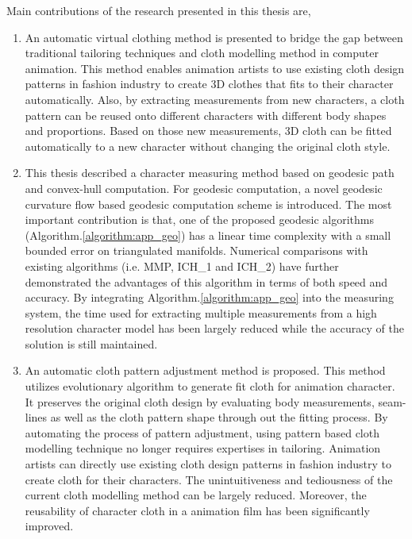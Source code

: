 Main contributions of the research presented in this thesis are,
\begin{enumerate}

	\item An automatic virtual clothing method is presented to bridge the gap between traditional tailoring techniques and cloth modelling method in computer animation. This method enables animation artists to use existing cloth design patterns in fashion industry to create 3D clothes that fits to their character automatically. Also, by extracting measurements from new characters, a cloth pattern can be reused onto different characters with different body shapes and proportions. Based on those new measurements, 3D cloth can be fitted automatically to a new character without changing the original cloth style. 

	\item This thesis described a character measuring method based on geodesic path and convex-hull computation. For geodesic computation, a novel geodesic curvature flow based geodesic computation scheme is introduced. The most important contribution is that, one of the proposed geodesic algorithms (Algorithm.\ref{algorithm:app_geo}) has a linear time complexity with a small bounded error on triangulated manifolds. Numerical comparisons with existing algorithms (i.e. MMP, ICH\_1 and ICH\_2) have further demonstrated the advantages of this algorithm in terms of both speed and accuracy. By integrating Algorithm.\ref{algorithm:app_geo} into the measuring system, the time used for extracting multiple measurements from a high resolution character model has been largely reduced while the accuracy of the solution is still maintained. 
			
  	\item An automatic cloth pattern adjustment method is proposed. This method utilizes evolutionary algorithm to generate fit cloth for animation character. It preserves the original cloth design by evaluating body measurements, seam-lines as well as the cloth pattern shape through out the fitting process. By automating the process of pattern adjustment, using pattern based cloth modelling technique no longer requires expertises in tailoring. Animation artists can directly use existing cloth design patterns in fashion industry to create cloth for their characters. The unintuitiveness and tediousness of the current cloth modelling method can be largely reduced. Moreover, the reusability of character cloth in a animation film has been significantly improved.
  	
\end{enumerate}



